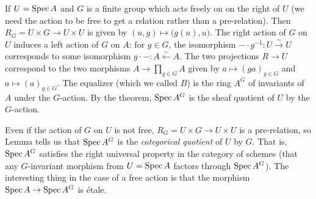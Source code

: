 

 \begin{example} \label{lec14Eg:Quot_by_finite_group}
   If $U=\operatorname{Spec} A$ and $G$ is a finite group which acts freely on on the right of $U$ (we
   need the action to be free to get a relation rather than a pre-relation). Then
   $R_G=U\times G\to U\times U$ is given by $(u,g)\mapsto \bigl(g(u),u\bigr)$. The right
   action of $G$ on $U$ induces a left action of $G$ on $A$: for $g\in G$, the
   isomorphism $-\cdot g^{-1}:U\xrightarrow\sim U$ corresponds to some isomorphism
   $g\cdot -:A\xleftarrow\sim A$. The two projections $R\to U$ correspond to the two
   morphisms $A\to \prod_{g\in G} A$ given by $a\mapsto (ga)_{g\in G}$  and $a\mapsto (a)_{g\in G}$. The equalizer (which we called $B$)
   is the ring $A^G$ of invariants of $A$ under the $G$-action. By the theorem, $\operatorname{Spec}
   A^G$ is the sheaf quotient of $U$ by the $G$-action.

   Even if the action of $G$ on $U$ is not free, $R_G=U\times G\to U\times U$ is a
   pre-relation, so Lemma  tells us that $\operatorname{Spec} A^G$ is the
   \emph{categorical quotient} of $U$ by $G$. That is, $\operatorname{Spec} A^G$ satisfies the right
   universal property in the category of schemes (that any $G$-invariant morphism from
   $U=\operatorname{Spec} A$ factors through $\operatorname{Spec} A^G$). The interesting thing in the case of a free
   action is that the morphism $\operatorname{Spec} A\to \operatorname{Spec} A^G$ is \'etale.
 \end{example}

